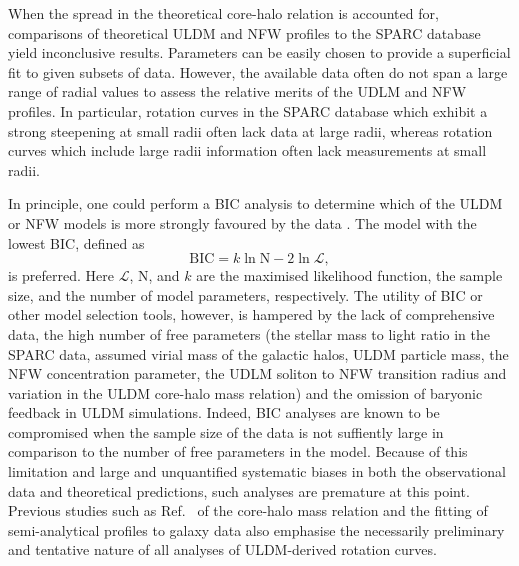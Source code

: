 \documentclass{pasa}%
\begin{document}
When the spread in the theoretical core-halo relation is accounted for, comparisons of theoretical ULDM and NFW profiles to the SPARC database yield inconclusive results. Parameters can be easily chosen to provide a superficial fit to given subsets of data. However, the available data often do not span a large range of radial values to assess the relative merits of the UDLM and NFW profiles. In particular, rotation curves in the SPARC database which exhibit a strong steepening at small radii often lack data at large radii, whereas rotation curves which include large radii information often lack measurements at small radii. %

In principle, one could perform a BIC analysis to determine which of the ULDM or NFW models is more strongly favoured by the data \cite{Liddle:2004nh}. The model with the lowest BIC, defined as
\begin{equation}
    \mathrm{BIC} = k \ln{\mathrm{N}} - 2 \ln{\mathcal{L}},    
\end{equation}
is preferred. Here $\mathcal{L}$, $\mathrm{N}$, and $k$ are the maximised likelihood function, the sample size, and the number of model parameters, respectively. The utility of BIC or other model selection tools, however, is hampered by the lack of comprehensive data, the high number of free parameters (the stellar mass to light ratio in the SPARC data, assumed virial mass of the galactic halos,  ULDM particle mass, the NFW concentration parameter, the UDLM soliton to NFW transition radius and  variation in the ULDM core-halo mass relation) and the omission of baryonic feedback in ULDM simulations. Indeed, BIC analyses are known to be compromised when the sample size of the data is not suffiently large in comparison to the number of free parameters in the model. Because of this limitation and large and unquantified systematic biases in both the observational data and theoretical predictions, such analyses are premature at this point. Previous studies such as Ref.~\cite{Bar2018acw} of the core-halo mass relation and the fitting of semi-analytical profiles to galaxy data also emphasise the necessarily preliminary and tentative nature of all analyses of ULDM-derived rotation curves. 
\end{document}
